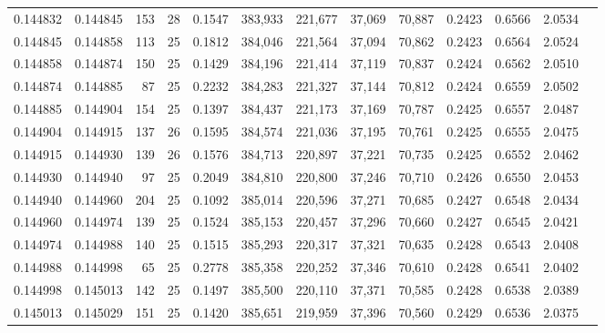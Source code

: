 \begin{tabular}{rrrrrrrrrrrrr}
0.144832 & 0.144845 &   153 &  28 &                                     0.1547 & 383,933 & 221,677 &  37,069 &  70,887 & 0.2423 & 0.6566 & 2.0534 \\
0.144845 & 0.144858 &   113 &  25 &                                     0.1812 & 384,046 & 221,564 &  37,094 &  70,862 & 0.2423 & 0.6564 & 2.0524 \\
0.144858 & 0.144874 &   150 &  25 &                                     0.1429 & 384,196 & 221,414 &  37,119 &  70,837 & 0.2424 & 0.6562 & 2.0510 \\
0.144874 & 0.144885 &    87 &  25 &                                     0.2232 & 384,283 & 221,327 &  37,144 &  70,812 & 0.2424 & 0.6559 & 2.0502 \\
0.144885 & 0.144904 &   154 &  25 &                                     0.1397 & 384,437 & 221,173 &  37,169 &  70,787 & 0.2425 & 0.6557 & 2.0487 \\
0.144904 & 0.144915 &   137 &  26 &                                     0.1595 & 384,574 & 221,036 &  37,195 &  70,761 & 0.2425 & 0.6555 & 2.0475 \\
0.144915 & 0.144930 &   139 &  26 &                                     0.1576 & 384,713 & 220,897 &  37,221 &  70,735 & 0.2425 & 0.6552 & 2.0462 \\
0.144930 & 0.144940 &    97 &  25 &                                     0.2049 & 384,810 & 220,800 &  37,246 &  70,710 & 0.2426 & 0.6550 & 2.0453 \\
0.144940 & 0.144960 &   204 &  25 &                                     0.1092 & 385,014 & 220,596 &  37,271 &  70,685 & 0.2427 & 0.6548 & 2.0434 \\
0.144960 & 0.144974 &   139 &  25 &                                     0.1524 & 385,153 & 220,457 &  37,296 &  70,660 & 0.2427 & 0.6545 & 2.0421 \\
0.144974 & 0.144988 &   140 &  25 &                                     0.1515 & 385,293 & 220,317 &  37,321 &  70,635 & 0.2428 & 0.6543 & 2.0408 \\
0.144988 & 0.144998 &    65 &  25 &                                     0.2778 & 385,358 & 220,252 &  37,346 &  70,610 & 0.2428 & 0.6541 & 2.0402 \\
0.144998 & 0.145013 &   142 &  25 &                                     0.1497 & 385,500 & 220,110 &  37,371 &  70,585 & 0.2428 & 0.6538 & 2.0389 \\
0.145013 & 0.145029 &   151 &  25 &                                     0.1420 & 385,651 & 219,959 &  37,396 &  70,560 & 0.2429 & 0.6536 & 2.0375 \\

\end{tabular}
